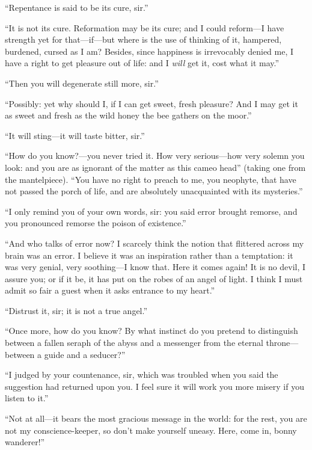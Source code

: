 \enquote{Repentance is said to be its cure, sir.}

\enquote{It is not its cure. Reformation may be its cure; and I could
reform---I have strength yet for that---if---but where is the use of
thinking of it, hampered, burdened, cursed as I am? Besides, since
happiness is irrevocably denied me, I have a right to get pleasure out
of life: and I \emph{will} get it, cost what it may.}

\enquote{Then you will degenerate still more, sir.}

\enquote{Possibly: yet why should I, if I can get sweet, fresh
pleasure? And I may get it as sweet and fresh as the wild honey the bee
gathers on the moor.}

\enquote{It will sting---it will taste bitter, sir.}

\enquote{How do you know?---you never tried it. How very serious---how
very solemn you look: and you are as ignorant of the matter as this
cameo head} (taking one from the mantelpiece). \enquote{You have no
right to preach to me, you neophyte, that have not passed the porch of
life, and are absolutely unacquainted with its mysteries.}

\enquote{I only remind you of your own words, sir: you said error
brought remorse, and you pronounced remorse the poison of existence.}

\enquote{And who talks of error now? I scarcely think the notion that
flittered across my brain was an error. I believe it was an inspiration
rather than a temptation: it was very genial, very soothing---I know
that. Here it comes again! It is no devil, I assure you; or if it be,
it has put on the robes of an angel of light. I think I must admit so
fair a guest when it asks entrance to my heart.}

\enquote{Distrust it, sir; it is not a true angel.}

\enquote{Once more, how do you know? By what instinct do you pretend to
distinguish between a fallen seraph of the abyss and a messenger from
the eternal throne---between a guide and a seducer?}

\enquote{I judged by your countenance, sir, which was troubled when you
said the suggestion had returned upon you. I feel sure it will work you
more misery if you listen to it.}

\enquote{Not at all---it bears the most gracious message in the world:
for the rest, you are not my conscience-keeper, so don't make yourself
uneasy. Here, come in, bonny wanderer!}

